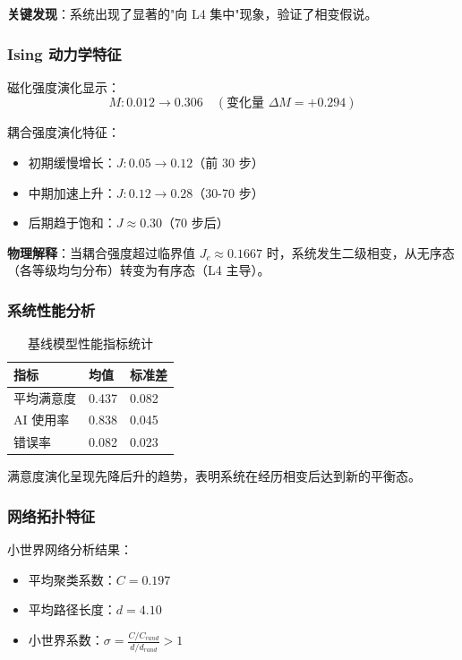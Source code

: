 \documentclass[a4paper,12pt]{article}
\begin{document}
\textbf{关键发现}：系统出现了显著的"向 L4 集中"现象，验证了相变假说。

\subsubsection{Ising 动力学特征}

磁化强度演化显示：
\begin{equation}
    M: 0.012 \rightarrow 0.306 \quad (\text{变化量 } \Delta M = +0.294)
\end{equation}

耦合强度演化特征：
\begin{itemize}
    \item 初期缓慢增长：$J: 0.05 \rightarrow 0.12$（前 30 步）
    \item 中期加速上升：$J: 0.12 \rightarrow 0.28$（30-70 步）
    \item 后期趋于饱和：$J \approx 0.30$（70 步后）
\end{itemize}

\textbf{物理解释}：当耦合强度超过临界值 $J_c \approx 0.1667$ 时，系统发生二级相变，从无序态（各等级均匀分布）转变为有序态（L4 主导）。

\subsubsection{系统性能分析}

\begin{table}[H]
\centering
\caption{基线模型性能指标统计}
\begin{tabular}{lll}
\toprule
\textbf{指标} & \textbf{均值} & \textbf{标准差} \\
\midrule
平均满意度 & 0.437 & 0.082 \\
AI 使用率 & 0.838 & 0.045 \\
错误率 & 0.082 & 0.023 \\
\bottomrule
\end{tabular}
\end{table}

满意度演化呈现先降后升的趋势，表明系统在经历相变后达到新的平衡态。

\subsubsection{网络拓扑特征}

小世界网络分析结果：
\begin{itemize}
    \item 平均聚类系数：$C = 0.197$
    \item 平均路径长度：$d = 4.10$
    \item 小世界系数：$\sigma = \frac{C/C_{rand}}{d/d_{rand}} > 1$
\end{itemize}
\end{document}
